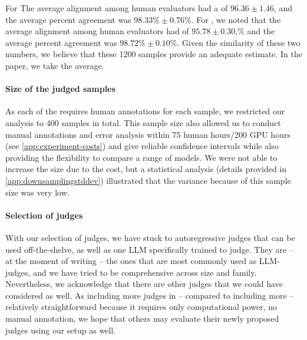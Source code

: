For  The average alignment among human evaluators had a \scottspi of $96.36\pm1.46$,%
and the average percent agreement was $98.33\%\pm0.76\%$.
For , we noted that the average alignment among human evaluators had \scottspi of $95.78\pm0.30$,\% and the average percent agreement was $98.72\%\pm0.10\%$.
Given the similarity of these two numbers, we believe that these 1200 samples provide an adequate estimate.
In the paper, we take the average.

\paragraph{Size of the judged samples}
As each of the \nexamtakersword \evaluatormodels requires human annotations for each sample, we restricted our analysis to 400 samples in total.
This sample size also allowed us to conduct manual annotations and error analysis within 75 human hours/200 GPU hours (see \cref{app:experiment-costs}) and give reliable confidence intervals while also providing the flexibility to compare a range of models. 
We were not able to increase the size due to the cost, but a statistical analysis (details provided in \cref{app:downsamplingstddev}) illustrated that the variance because of this sample size was very low.

\paragraph{Selection of judges}
With our selection of judges, we have stuck to autoregressive judges that can be used off-the-shelve, as well as one LLM specifically trained to judge.
They are -- at the moment of writing -- the ones that are most commonly used as LLM-judges, and we have tried to be comprehensive across size and family.
Nevertheless, we acknowledge that there are other judges that we could have considered as well.
As including more judges in -- compared to including more \evaluatormodels -- relatively straightforward because it requires only computational power, no manual annotation, we hope that others may evaluate their newly proposed judges using our setup as well.


